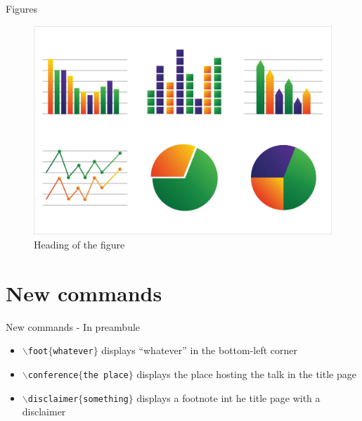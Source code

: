 \documentclass[numbertotal,toc,wide]{bpslides}
\begin{document}
\begin{frame}{Figures}
	\begin{figure}
		\centering
		\caption{Heading of the figure}
		\includegraphics[width=0.9\paperheight]{graph}
	\end{figure}
\end{frame}

\section{New commands}

\begin{frame}{New commands - In preambule}
	\begin{itemize}
		\item \texttt{$\backslash$foot$\{$whatever$\}$} displays ``whatever'' in the bottom-left corner
		\item \texttt{$\backslash$conference$\{$the place$\}$} displays the place hosting the talk in the title page
		\item \texttt{$\backslash$disclaimer$\{$something$\}$} displays a footnote int he title page with a disclaimer
	\end{itemize}
\end{frame}
\end{document}
